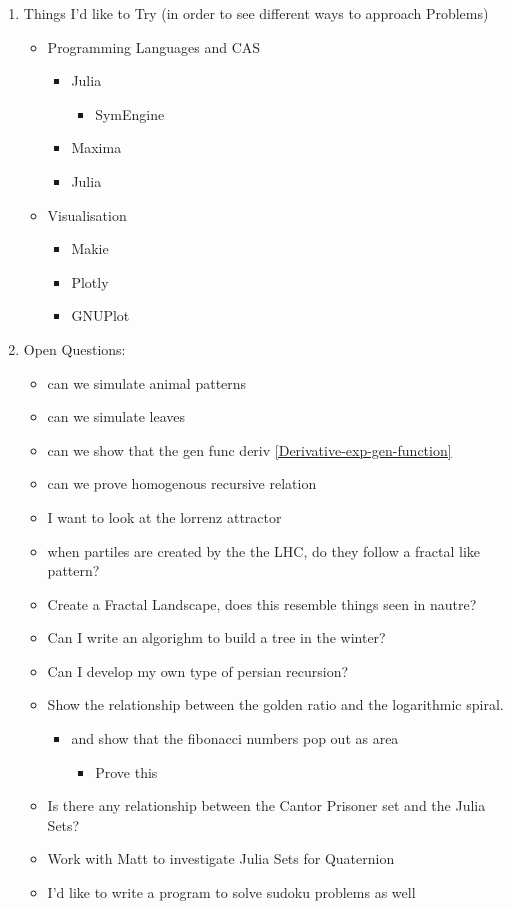 \documentclass[11pt]{article}
\begin{document}
\begin{enumerate}
\item Things I'd like to Try (in order to see different ways to approach Problems)
\begin{itemize}
\item Programming Languages and CAS
\begin{itemize}
\item Julia
\begin{itemize}
\item SymEngine
\end{itemize}
\item Maxima
\item Julia
\end{itemize}
\item Visualisation
\begin{itemize}
\item Makie
\item Plotly
\item GNUPlot
\end{itemize}
\end{itemize}
\item Open Questions:
\begin{itemize}
\item can we simulate animal patterns
\item can we simulate leaves
\item can we show that the gen func deriv \ref{Derivative-exp-gen-function}
\item can we prove homogenous recursive relation
\item I want to look at the lorrenz attractor
\item when partiles are created by the the LHC, do they follow a fractal like pattern?
\item Create a Fractal Landscape, does this resemble things seen in nautre? \cite[p. 464]{peitgenChaosFractalsNew2004}
\item Can I write an algorighm to build a tree in the winter?
\item Can I develop my own type of persian recursion?
\item Show the relationship between the golden ratio and the logarithmic spiral.
\begin{itemize}
\item and show that the fibonacci numbers pop out as area
\begin{itemize}
\item Prove this
\end{itemize}
\end{itemize}
\item Is there any relationship between the Cantor Prisoner set and the Julia Sets?
\item Work with Matt to investigate Julia Sets for Quaternion \cite[]{peitgenChaosFractalsNew2004}
\item I'd like to write a program to solve sudoku problems as well
\end{itemize}
\end{enumerate}
\end{document}
